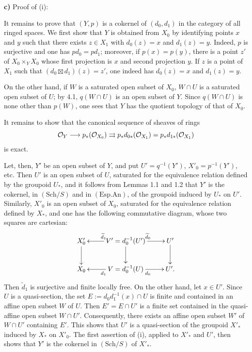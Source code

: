 \textbf{c)} Proof of (i):

It remains to prove that $(Y,p)$ is a cokernel of $(d_0,d_1)$ in the category of all ringed spaces. We first show that $Y$ is obtained from $X_0$ by identifying points $x$ and $y$ such that there exists $z\in X_1$ with $d_0(z)=x$ and $d_1(z)=y$. Indeed, $p$ is surjective and one has $pd_0=pd_1$; moreover, if $p(x)=p(y)$, there is a point $z'$ of $X_0\times_YX_0$ whose first projection is $x$ and second projection $y$. If $z$ is a point of $X_1$ such that $(d_0\boxtimes d_1)(z)=z'$, one indeed has $d_0(z)=x$ and $d_1(z)=y$.

On the other hand, if $W$ is a saturated open subset of $X_0$, $W\cap U$ is a saturated open subset of $U$; by 4.1, $q(W\cap U)$ is an open subset of $Y$. Since $q(W\cap U)$ is none other than $p(W)$, one sees that $Y$ has the quotient topology of that of $X_0$.

It remains to show that the canonical sequence of sheaves of rings
\[
\mathcal{O}_Y\longrightarrow p_*(\mathcal{O}_{X_0})\rightrightarrows p_*d_{0*}(\mathcal{O}_{X_1})=p_*d_{1*}(\mathcal{O}_{X_1})
\]
is exact.

Let, then, $Y'$ be an open subset of $Y$, and put $U'=q^{-1}(Y')$, $X'_0=p^{-1}(Y')$, etc. Then $U'$ is an open subset of $U$, saturated for the equivalence relation defined by the groupoid $U_*$, and it follows from Lemmas 1.1 and 1.2 that $Y'$ is the cokernel, in $(\mathrm{Sch}/S)$ and in $(\mathrm{Esp.An})$, of the groupoid induced by $U_*$ on $U'$. Similarly, $X'_0$ is an open subset of $X_0$, saturated for the equivalence relation defined by $X_*$, and one has the following commutative diagram, whose two squares are cartesian:
\[
\xymatrix{X'_0\ar[d]&V'=d_0^{-1}(U')\ar[l]_{\widetilde d_1}\ar[r]^{\widetilde d_0}\ar[d]&U'\ar[d]\\X_0&V=d_0^{-1}(U)\ar[l]^{d_1}\ar[r]_{d_0}&U'.}
\]
Then $\widetilde d_1$ is surjective and finite locally free. On the other hand, let $x\in U'$. Since $U$ is a quasi-section, the set $E:=d_0d_1^{-1}(x)\cap U$ is finite and contained in an affine open subset $W$ of $U$. Then $E'=E\cap U'$ is a finite set contained in the quasi-affine open subset $W\cap U'$. Consequently, there exists an affine open subset $W'$ of $W\cap U'$ containing $E'$. This shows that $U'$ is a quasi-section of the groupoid $X'_*$ induced by $X_*$ on $X'_0$. The first assertion of (i), applied to $X'_*$ and $U'$, then shows that $Y'$ is the cokernel in $(\mathrm{Sch}/S)$ of $X'_*$.


